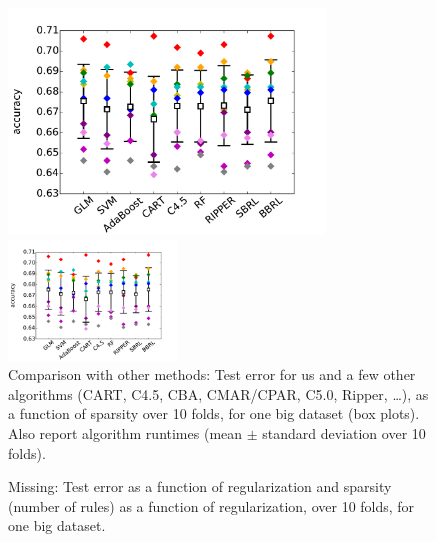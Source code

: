 \begin{figure}[t!]
\begin{center}
\begin{arxiv}
\includegraphics[width=0.75\textwidth]{figs/compare-compas.pdf}
\end{arxiv}
\begin{kdd}
\includegraphics[width=0.4\textwidth]{figs/compare-compas.pdf}
\end{kdd}
\end{center}
\caption{Comparison with other methods:
Test error for us and a few other algorithms
(CART, C4.5, CBA, CMAR/CPAR, C5.0, Ripper, \dots),
as a function of sparsity over 10 folds, for one big dataset (box plots).
Also report algorithm runtimes (mean $\pm$ standard deviation over 10 folds).}
\label{fig:comparison}
\end{figure}

\begin{arxiv}
\begin{figure}[t!]
\begin{center}
\end{center}
\caption{Missing:  Test error as a function of regularization and sparsity
(number of rules) as a function of regularization, over 10 folds,
for one big dataset.}
\label{fig:regularization}
\end{figure}
\end{arxiv}

